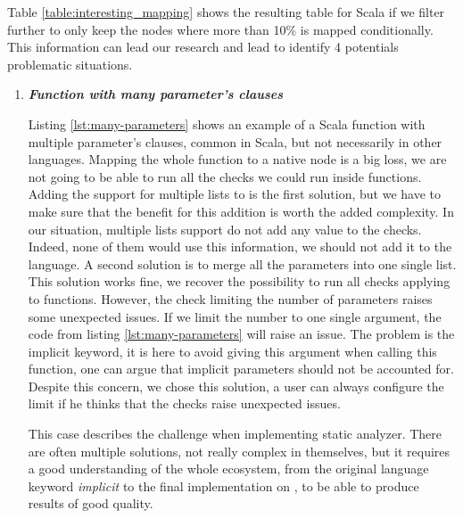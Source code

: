 Table \ref{table:interesting_mapping} shows the resulting table for Scala if we filter further to only keep the nodes where more than 10\% is mapped conditionally. 
This information can lead our research and lead to identify 4 potentials problematic situations.

\begin{enumerate}
	\item \textbf{\textit{Function with many parameter's clauses}} \newline 
	
	
	Listing \ref{lst:many-parameters} shows an example of a Scala function with multiple parameter's clauses, common in Scala, but not necessarily in other languages. 
	Mapping the whole function to a native node is a big loss, we are not going to be able to run all the checks we could run inside functions.
	Adding the support for multiple lists to \slang{} is the first solution, but we have to make sure  that the benefit for this addition is worth the added complexity.
	In our situation, multiple lists support do not add any value to the checks.
	Indeed, none of them would use this information, we should not add it to the language.
	A second solution is to merge all the parameters into one single list.
	This solution works fine, we recover the possibility to run all checks applying to functions.
	However, the check limiting the number of parameters raises some unexpected issues.
	If we limit the number to one single argument, the code from listing \ref{lst:many-parameters} will raise an issue.
	The problem is the implicit keyword, it is here to avoid giving this argument when calling this function, one can argue that implicit parameters should not be accounted for.
	Despite this concern, we chose this solution, a user can always configure the limit if he thinks that the checks raise unexpected issues.
	
	This case describes the challenge when implementing static analyzer.
	There are often multiple solutions, not really complex in themselves, but it requires a good understanding of the whole ecosystem, from the original language keyword \emph{implicit} to the final implementation on \slang{}, to be able to produce results of good quality.
	

\end{enumerate}
